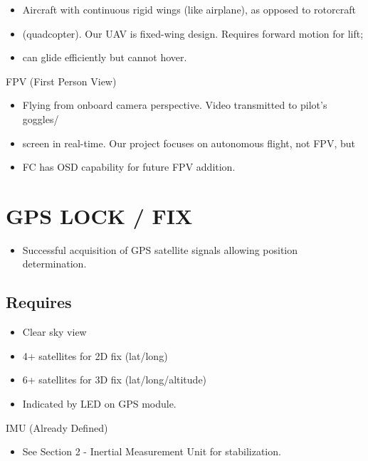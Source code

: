 \documentclass[11pt,letterpaper]{article}
\begin{document}
\begin{itemize}
  \item Aircraft with continuous rigid wings (like airplane), as opposed to rotorcraft
  \item (quadcopter). Our UAV is fixed-wing design. Requires forward motion for lift;
  \item can glide efficiently but cannot hover.
\end{itemize}

FPV (First Person View)\par

\begin{itemize}
  \item Flying from onboard camera perspective. Video transmitted to pilot's goggles/
  \item screen in real-time. Our project focuses on autonomous flight, not FPV, but
  \item FC has OSD capability for future FPV addition.
\end{itemize}

\section{GPS LOCK / FIX}

\begin{itemize}
  \item Successful acquisition of GPS satellite signals allowing position determination.
\end{itemize}

\subsection{Requires}

\begin{itemize}
  \item Clear sky view
  \item 4+ satellites for 2D fix (lat/long)
  \item 6+ satellites for 3D fix (lat/long/altitude)
  \item Indicated by LED on GPS module.
\end{itemize}

IMU (Already Defined)\par

\begin{itemize}
  \item See Section 2 - Inertial Measurement Unit for stabilization.
\end{itemize}
\end{document}
